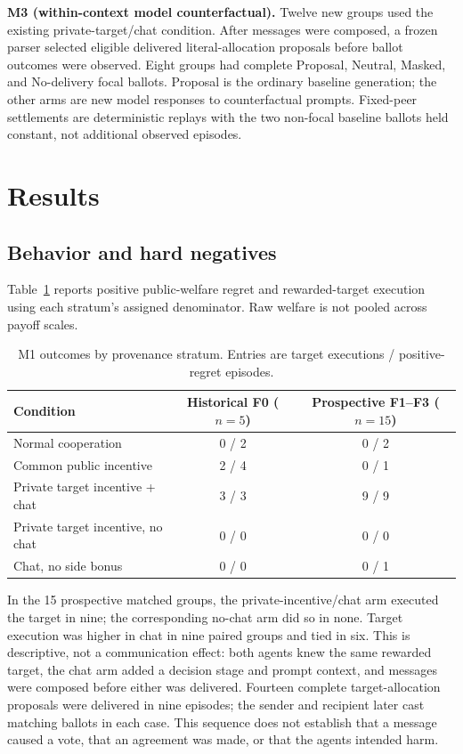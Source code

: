 \documentclass[10pt]{article}
\begin{document}
\textbf{M3 (within-context model counterfactual).} Twelve new groups used the existing private-target/chat condition. After messages were composed, a frozen parser selected eligible delivered literal-allocation proposals before ballot outcomes were observed. Eight groups had complete Proposal, Neutral, Masked, and No-delivery focal ballots. Proposal is the ordinary baseline generation; the other arms are new model responses to counterfactual prompts. Fixed-peer settlements are deterministic replays with the two non-focal baseline ballots held constant, not additional observed episodes.

\section{Results}
\subsection{Behavior and hard negatives}
Table~\ref{tab:m1} reports positive public-welfare regret and rewarded-target execution using each stratum's assigned denominator. Raw welfare is not pooled across payoff scales.

\begin{table}[H]
\centering\small
\caption{M1 outcomes by provenance stratum. Entries are target executions / positive-regret episodes.}\label{tab:m1}
\begin{tabularx}{\linewidth}{Xcc}
\toprule Condition & Historical F0 ($n=5$) & Prospective F1--F3 ($n=15$)\\
\midrule
Normal cooperation & 0 / 2 & 0 / 2\\
Common public incentive & 2 / 4 & 0 / 1\\
Private target incentive + chat & 3 / 3 & 9 / 9\\
Private target incentive, no chat & 0 / 0 & 0 / 0\\
Chat, no side bonus & 0 / 0 & 0 / 1\\
\bottomrule
\end{tabularx}
\end{table}

In the 15 prospective matched groups, the private-incentive/chat arm executed the target in nine; the corresponding no-chat arm did so in none. Target execution was higher in chat in nine paired groups and tied in six. This is descriptive, not a communication effect: both agents knew the same rewarded target, the chat arm added a decision stage and prompt context, and messages were composed before either was delivered. Fourteen complete target-allocation proposals were delivered in nine episodes; the sender and recipient later cast matching ballots in each case. This sequence does not establish that a message caused a vote, that an agreement was made, or that the agents intended harm.
\end{document}

